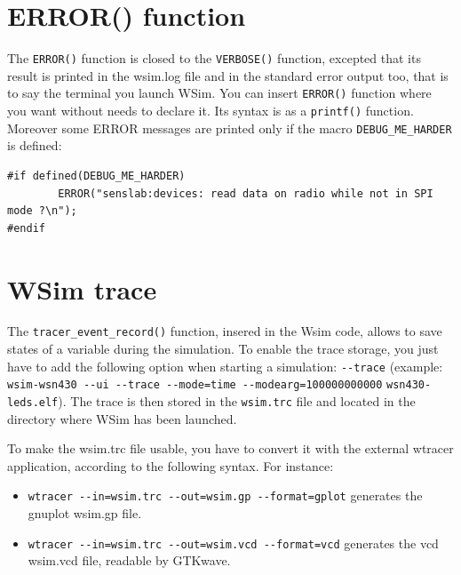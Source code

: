 \documentclass[a4paper,10pt]{report}
\begin{document}
\section{ERROR() function}
The \verb$ERROR()$ function is closed to the \verb$VERBOSE()$ function, excepted that its result is printed in the wsim.log file and in the standard error output too, that is to say the terminal you launch WSim.
You can insert \verb$ERROR()$ function where you want without needs to declare it. Its syntax is as a \verb$printf()$ function.
Moreover some ERROR messages are printed only if the macro \verb$DEBUG_ME_HARDER$ is defined:
\begin{verbatim}
#if defined(DEBUG_ME_HARDER)
	    ERROR("senslab:devices: read data on radio while not in SPI mode ?\n");
#endif
\end{verbatim}

\section{WSim trace}
The \verb$tracer_event_record()$ function, insered in the Wsim code, allows to save states of a variable during the simulation. To enable the trace storage, you just have to add the following option when starting a simulation: \verb$--trace$ (example: \verb$wsim-wsn430 --ui --trace --mode=time --modearg=100000000000$ \verb$wsn430-leds.elf$). The trace is then stored in the \verb$wsim.trc$ file and located in the  directory where WSim has been launched.

To make the wsim.trc file usable, you have to convert it with the external wtracer application, according to the following syntax. For instance:
\begin{itemize}
  \item\verb$wtracer --in=wsim.trc --out=wsim.gp --format=gplot$ generates the gnuplot wsim.gp file. 
  \item\verb$wtracer --in=wsim.trc --out=wsim.vcd --format=vcd$ generates the vcd wsim.vcd file, readable by GTKwave.
\end{itemize}
\end{document}
